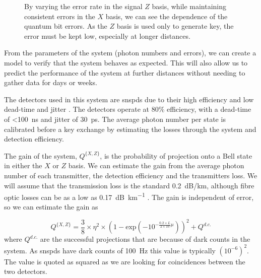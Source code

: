 \begin{figure}[tbp]
	\caption[Error dependence of secret key rate]{By varying the error rate in the signal $Z$ basis, while maintaining consistent errors in the $X$ basis, we can see the dependence of the quantum bit errors. As the $Z$ basis is used only to generate key, the error must be kept low, especially at longer distances.}
	\label{fig:skr_error_dependence}
\end{figure}

From the parameters of the system (photon numbers and errors), we can create a model to verify that the system behaves as expected. This will also allow us to predict the performance of the system at further distances without needing to gather data for days or weeks. 

The detectors used in this system are \acp{snspd} due to their high efficiency and low dead-time and jitter \cite{}. The detectors operate at $80\%$ efficiency, with a dead-time of \SI{<100}{ns} and jitter of \SI{30}{ps}. The average photon number per state is calibrated before a key exchange by estimating the losses through the system and detection efficiency.

The gain of the system, $Q^{ \{X,Z\} }$, is the probability of projection onto a Bell state in either the $X$ or $Z$ basis. We can estimate the gain from the average photon number of each transmitter, the detection efficiency and the transmitters loss. We will assume that the transmission loss is the standard \SI{0.2}{dB/km}, although fibre optic losses can be as a low as \SI{0.17}{dB\per\km} \cite{corningULL}. The gain is independent of error, so we can estimate the gain as 

\begin{equation}
	Q^{ \{X,Z\} } = \frac{3}{8}  \times \eta^2 \times \left( 1 - \text{exp} \left( -10^{- \frac{0.2 \times L}{2 \times 10} \mu}  \right)  \right)^2 + Q^{d.c.}
\end{equation}
where $Q^{d.c.}$ are the successful projections that are because of dark counts in the system. As \acp{snspd} have dark counts of \SI{100}{Hz} this value is typically $\left(10^{-6}\right)^2$. The value is quoted as squared as we are looking for coincidences between the two detectors. 

